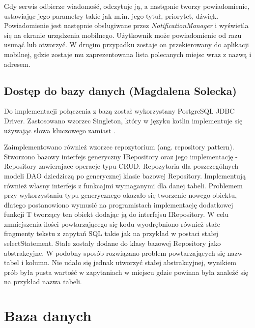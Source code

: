 \documentclass[10pt,twoside,a4paper]{report}
\begin{document}
\par Gdy serwis odbierze wiadomość, odczytuje ją, a następnie tworzy powiadomienie, ustawiając jego parametry takie jak m.in. jego tytuł, priorytet, dźwięk. Powiadomienie jest następnie obsługiwane przez \textit{NotificationManager} i wyświetla się na ekranie urządzenia mobilnego. Użytkownik może powiadomienie od razu usunąć lub otworzyć. W drugim przypadku zostaje on przekierowany do aplikacji mobilnej, gdzie zostaje mu zaprezentowana lista polecanych miejsc wraz z nazwą i adresem.

\section{Dostęp do bazy danych (Magdalena Solecka)}
\par Do implementacji połączenia z bazą został wykorzystany PostgreSQL JDBC Driver. Zastosowano wzorzec Singleton, który w języku kotlin implementuje się używając słowa kluczowego \cite{object} zamiast \cite{class}.
\par Zaimplementowano również wzorzec repozytorium (ang. repository pattern). Stworzono bazowy interfejs generyczny IRepository oraz jego implementację - Repository zawierajace operacje typu CRUD. Repozytoria dla poszczególnych modeli DAO dziedziczą po generycznej klasie bazowej Repository. Implementują również własny interfejs z funkcajmi wymaganymi dla danej tabeli. Problemem przy wykorzystaniu typu generycznego okazało się tworzenie nowego obiektu, dlatego postanowiono wymusić na programistach implementację dodatkowej funkcji T tworzący ten obiekt dodając ją do interfejsu IRepository. W celu zmniejszenia ilości powtarzającego się kodu wyodrębniono również stałe fragmenty tekstu z zapytań SQL takie jak na przykład \cite{SELECT * FROM tableName } w postaci stałej selectStatement. Stałe zostały dodane do klasy bazowej Repository jako abstrakcyjne. W podobny sposób rozwiązano problem powtarzających się nazw tabel i kolumn. Nie udało się jednak utworzyć stałej abstrakcyjnej, wynikiem prób była pusta wartość w zapytaniach w miejscu gdzie powinna była znaleźć się na przykład nazwa tabeli.
	

\chapter{Baza danych}
\end{document}
